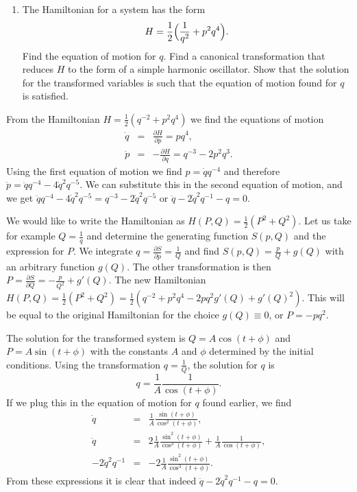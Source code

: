 \documentclass[letterpaper,11pt]{article}
\begin{document}
\begin{enumerate}[resume]
 \item The Hamiltonian for a system has the form
 \begin{equation*}
  H = \frac{1}{2} \Bigl( \frac{1}{q^2} + p^2 q^4 \Bigr).
 \end{equation*}
 Find the equation of motion for $q$.  Find a canonical transformation that reduces $H$ to the form of a simple harmonic oscillator.  Show that the solution for the transformed variables is such that the equation of motion found for $q$ is satisfied.
\end{enumerate}

From the Hamiltonian $H = \frac{1}{2} (q^{-2} + p^2 q^4)$ we find the equations of motion
\begin{eqnarray*}
 \dot{q} & = & \frac{\partial H}{\partial p} = p q^4, \\
 \dot{p} & = & - \frac{\partial H}{\partial q} = q^{-3} - 2 p^2 q^3.
\end{eqnarray*}
Using the first equation of motion we find $p = \dot{q} q^{-4}$ and therefore $\dot{p} = \ddot{q} q^{-4} - 4\dot{q}^2 q^{-5}$.  We can substitute this in the second equation of motion, and we get $\ddot{q} q^{-4} - 4\dot{q}^2 q^{-5} = q^{-3} - 2 \dot{q}^2 q^{-5}$ or $\ddot{q} - 2 \dot{q}^2 q^{-1} - q = 0$.

We would like to write the Hamiltonian as $H(P,Q) = \frac{1}{2}(P^2 + Q^2)$.  Let us take for example $Q = \frac{1}{q}$ and determine the generating function $S(p,Q)$ and the expression for $P$.  We integrate $q = \frac{\partial S}{\partial p} = \frac{1}{Q}$ and find $S(p,Q) = \frac{p}{Q} + g(Q)$ with an arbitrary function $g(Q)$.  The other transformation is then $P = \frac{\partial S}{\partial Q} = -\frac{p}{Q^2} + g'(Q)$.  The new Hamiltonian $H(P,Q) = \frac{1}{2}(P^2 + Q^2) = \frac{1}{2} (q^{-2} + p^2 q^4 - 2 p q^2 g'(Q) + g'(Q)^2)$.  This will be equal to the original Hamiltonian for the choice $g(Q) \equiv 0$, or $P = -p q^2$.

The solution for the transformed system is $Q = A \cos (t + \phi)$ and $P = A \sin (t + \phi)$ with the constants $A$ and $\phi$ determined by the initial conditions.  Using the transformation $q = \frac{1}{Q}$, the solution for $q$ is $$q = \frac{1}{A} \frac{1}{\cos (t + \phi)}.$$  If we plug this in the equation of motion for $q$ found earlier, we find
\begin{eqnarray*}
 \dot{q} & = & \frac{1}{A} \frac{\sin (t+\phi)}{\cos^2 (t+\phi)}, \\
 \ddot{q} & = & 2 \frac{1}{A} \frac{\sin^2 (t+\phi)}{\cos^3 (t+\phi)} + \frac{1}{A} \frac{1}{\cos (t+\phi)}, \\
 -2\dot{q}^2 q^{-1} & = & -2 \frac{1}{A} \frac{\sin^2 (t+\phi)}{\cos^3 (t+\phi)}.
\end{eqnarray*}
From these expressions it is clear that indeed $\ddot{q} - 2 \dot{q}^2 q^{-1} - q = 0$.
\end{document}

